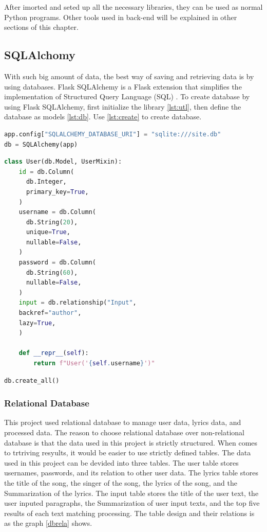 After imorted and seted up all the necessary libraries, they can be used as normal
Python programs. Other tools used in back-end will be explained in other sections
of this chapter.

\subsection{SQLAlchomy}

With such big amount of data, the best way of saving and retrieving data is by using
databases. Flask SQLAlchemy is a Flask extension that simplifies the implementation
of Structured Query Language (SQL) \cite{flask}. To create database by using Flask
SQLAlchemy, first initialize the library \ref{lst:utl}, then define the database
as models \ref{lst:db}. Use \ref{lst:create} to create database.

\begin{lstlisting}[language=Python, label={lst:utl}, caption=Flask SQLAlchemy Utilization]
app.config["SQLALCHEMY_DATABASE_URI"] = "sqlite:///site.db"
db = SQLAlchemy(app)
\end{lstlisting}

\begin{lstlisting}[language=Python, label={lst:db}, caption=Flask SQLAlchemy Model]
class User(db.Model, UserMixin):
    id = db.Column(
      db.Integer,
      primary_key=True,
    )
    username = db.Column(
      db.String(20),
      unique=True,
      nullable=False,
    )
    password = db.Column(
      db.String(60),
      nullable=False,
    )
    input = db.relationship("Input",
    backref="author",
    lazy=True,
    )

    def __repr__(self):
        return f"User('{self.username}')"
\end{lstlisting}

\begin{lstlisting}[language=Python, label={lst:create}, caption=Flask SQLAlchemy Create Database]
db.create_all()
\end{lstlisting}

\subsubsection{Relational Database}

This project used relational database to manage user data, lyrics data, and
processed data. The reason to choose relational database over non-relational
database is that the data used in this project is strictly structured. When comes
to trtriving resyults, it would be easier to use strictly defined tables. The data
used in this project can be devided into three tables. The user table stores usernames,
passwords, and its relation to other user data. The lyrics table stores the title of
the song, the singer of the song, the lyrics of the song, and the Summarization
of the lyrics. The input table stores the title of the user text, the user inputed
paragraphs, the Summarization of user input texts, and the top five results of
each text matching processing. The table design and their relations is as the graph
\ref{dbrela} shows.

